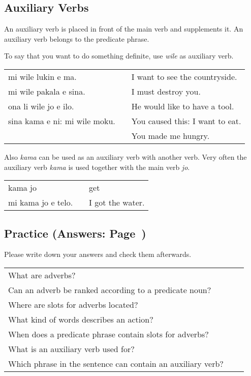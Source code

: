 %
%
\subsection*{Auxiliary Verbs}
%
%
An auxiliary verb is placed in front of the main verb and supplements it. 
An auxiliary verb belongs to the predicate phrase. 

To say that you want to do something definite, use \textit{wile} as auxiliary verb. 

\begin{supertabular}{p{5,5cm}|ll}
mi wile lukin e ma. && I want to see the countryside. \\
mi wile pakala e sina. && I must destroy you. \\
ona li wile jo e ilo. && He would like to have a tool. \\
sina kama e ni: mi wile moku. && You caused this: I want to eat. \\ && You made me hungry. \\
\end{supertabular} 

Also \textit{kama} can be used as an auxiliary verb with another verb.
Very often the auxiliary verb \textit{kama} is used together with the main verb \textit{jo}.  

\begin{supertabular}{p{5,5cm}|ll}
kama jo && get \\
mi kama jo e telo. && I got the water. \\
\end{supertabular} 

%
\newpage
\subsection*{Practice (Answers: Page~\pageref{'adverbs'})}

Please write down your answers and check them afterwards. 

\begin{supertabular}{p{5,5cm}|ll}
What are adverbs? &&  \\ %
Can an adverb be ranked according to a predicate noun? &&   \\ %
Where are slots for adverbs located? &&  \\ %
What kind of words describes an action? &&  \\ %
When does a predicate phrase contain slots for adverbs? &&  \\ %
What is an auxiliary verb used for?  &&   \\ %
Which phrase in the sentence can contain an auxiliary verb? &&   \\ %
\end{supertabular}

